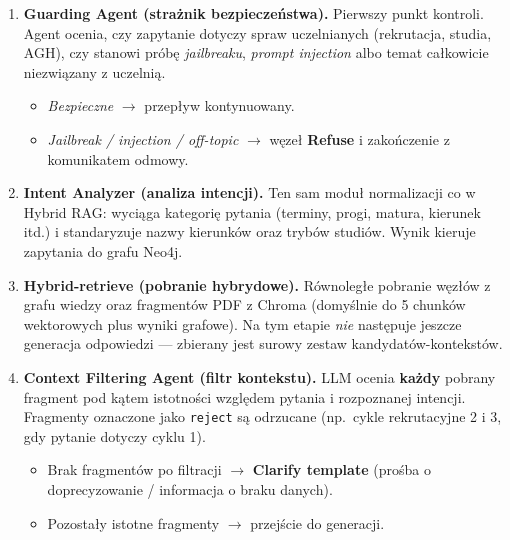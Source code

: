 \begin{tcolorbox}[colback=blue!5!white,colframe=blue!75!black,title=Opis etapów pipeline'u agentowego]
    \begin{enumerate}[leftmargin=*, nosep]
        \item \textbf{Guarding Agent (strażnik bezpieczeństwa).}
              Pierwszy punkt kontroli. Agent ocenia, czy zapytanie dotyczy spraw uczelnianych (rekrutacja, studia, AGH),
              czy stanowi próbę \textit{jailbreaku}, \textit{prompt injection} albo temat całkowicie niezwiązany z uczelnią.
              \begin{itemize}[nosep]
                  \item \textit{Bezpieczne} $\rightarrow$ przepływ kontynuowany.
                  \item \textit{Jailbreak / injection / off-topic} $\rightarrow$ węzeł \textbf{Refuse} i zakończenie z komunikatem odmowy.
              \end{itemize}

        \item \textbf{Intent Analyzer (analiza intencji).}
              Ten sam moduł normalizacji co w Hybrid RAG: wyciąga kategorię pytania (terminy, progi, matura, kierunek itd.)
              i standaryzuje nazwy kierunków oraz trybów studiów. Wynik kieruje zapytania do grafu Neo4j.

        \item \textbf{Hybrid-retrieve (pobranie hybrydowe).}
              Równoległe pobranie węzłów z grafu wiedzy oraz fragmentów PDF z Chroma (domyślnie do 5 chunków wektorowych
              plus wyniki grafowe). Na tym etapie \textit{nie} następuje jeszcze generacja odpowiedzi --- zbierany jest
              surowy zestaw kandydatów-kontekstów.

        \item \textbf{Context Filtering Agent (filtr kontekstu).}
              LLM ocenia \textbf{każdy} pobrany fragment pod kątem istotności względem pytania i rozpoznanej intencji.
              Fragmenty oznaczone jako \texttt{reject} są odrzucane (np.\ cykle rekrutacyjne 2 i 3, gdy pytanie dotyczy cyklu 1).
              \begin{itemize}[nosep]
                  \item Brak fragmentów po filtracji $\rightarrow$ \textbf{Clarify template} (prośba o doprecyzowanie / informacja o braku danych).
                  \item Pozostały istotne fragmenty $\rightarrow$ przejście do generacji.
              \end{itemize}


\end{enumerate}
\end{tcolorbox}
